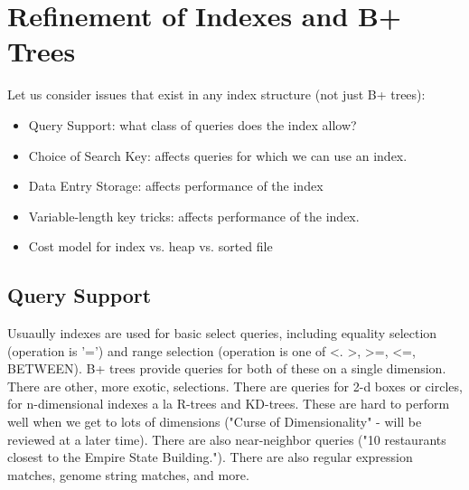\documentclass[10pt,a4paper]{book}
\begin{document}
\chapter{Refinement of Indexes and B+ Trees}
Let us consider issues that exist in any index structure (not just B+ trees):
\begin{itemize}
  \item Query Support: what class of queries does the index allow?
  \item Choice of Search Key: affects queries for which we can use an index.
  \item Data Entry Storage: affects performance of the index
  \item Variable-length key tricks: affects performance of the index.
  \item Cost model for index vs. heap vs. sorted file
\end{itemize}
\section{Query Support}
Usuaully indexes are used for basic select queries, including equality selection (operation is '=') and range selection (operation is one of <. >, >=, <=, BETWEEN). B+ trees provide queries for both of these on a single dimension.
There are other, more exotic, selections. There are queries for 2-d boxes or circles, for n-dimensional indexes a la R-trees and KD-trees. These are hard to perform well when we get to lots of dimensions ("Curse of Dimensionality" - will be reviewed at a later time). There are also near-neighbor queries ("10 restaurants closest to the Empire State Building."). There are also regular expression matches, genome string matches, and more. 
\end{document}
